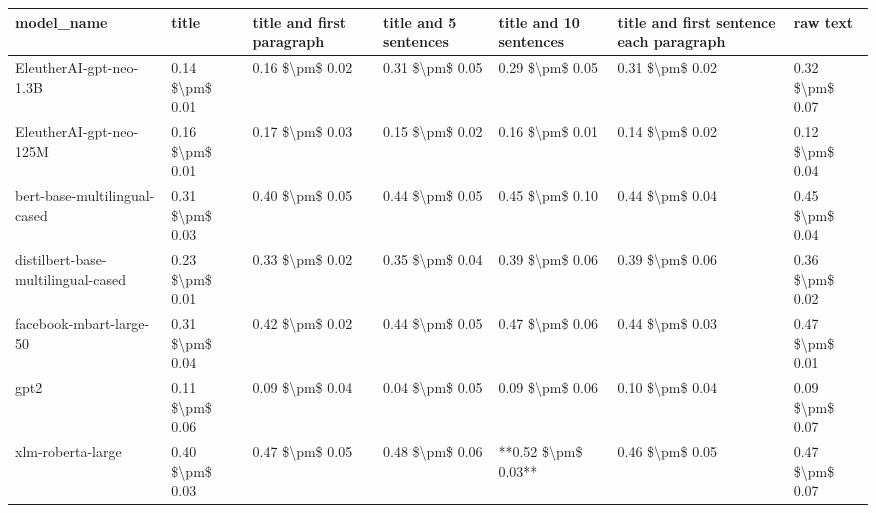 \begin{tabular}{lllllll}
\toprule
                        model\_name &           title & title and first paragraph & title and 5 sentences & title and 10 sentences & title and first sentence each paragraph &        raw text \\
\midrule
           EleutherAI-gpt-neo-1.3B & 0.14 \$\textbackslash pm\$ 0.01 &           0.16 \$\textbackslash pm\$ 0.02 &       0.31 \$\textbackslash pm\$ 0.05 &        0.29 \$\textbackslash pm\$ 0.05 &                         0.31 \$\textbackslash pm\$ 0.02 & 0.32 \$\textbackslash pm\$ 0.07 \\
           EleutherAI-gpt-neo-125M & 0.16 \$\textbackslash pm\$ 0.01 &           0.17 \$\textbackslash pm\$ 0.03 &       0.15 \$\textbackslash pm\$ 0.02 &        0.16 \$\textbackslash pm\$ 0.01 &                         0.14 \$\textbackslash pm\$ 0.02 & 0.12 \$\textbackslash pm\$ 0.04 \\
      bert-base-multilingual-cased & 0.31 \$\textbackslash pm\$ 0.03 &           0.40 \$\textbackslash pm\$ 0.05 &       0.44 \$\textbackslash pm\$ 0.05 &        0.45 \$\textbackslash pm\$ 0.10 &                         0.44 \$\textbackslash pm\$ 0.04 & 0.45 \$\textbackslash pm\$ 0.04 \\
distilbert-base-multilingual-cased & 0.23 \$\textbackslash pm\$ 0.01 &           0.33 \$\textbackslash pm\$ 0.02 &       0.35 \$\textbackslash pm\$ 0.04 &        0.39 \$\textbackslash pm\$ 0.06 &                         0.39 \$\textbackslash pm\$ 0.06 & 0.36 \$\textbackslash pm\$ 0.02 \\
           facebook-mbart-large-50 & 0.31 \$\textbackslash pm\$ 0.04 &           0.42 \$\textbackslash pm\$ 0.02 &       0.44 \$\textbackslash pm\$ 0.05 &        0.47 \$\textbackslash pm\$ 0.06 &                         0.44 \$\textbackslash pm\$ 0.03 & 0.47 \$\textbackslash pm\$ 0.01 \\
                              gpt2 & 0.11 \$\textbackslash pm\$ 0.06 &           0.09 \$\textbackslash pm\$ 0.04 &       0.04 \$\textbackslash pm\$ 0.05 &        0.09 \$\textbackslash pm\$ 0.06 &                         0.10 \$\textbackslash pm\$ 0.04 & 0.09 \$\textbackslash pm\$ 0.07 \\
                 xlm-roberta-large & 0.40 \$\textbackslash pm\$ 0.03 &           0.47 \$\textbackslash pm\$ 0.05 &       0.48 \$\textbackslash pm\$ 0.06 &    **0.52 \$\textbackslash pm\$ 0.03** &                         0.46 \$\textbackslash pm\$ 0.05 & 0.47 \$\textbackslash pm\$ 0.07 \\
\bottomrule
\end{tabular}
